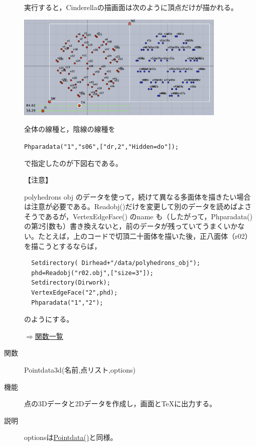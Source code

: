 \documentclass[papersize,a4paper,12pt,uplatex]{jsarticle}
\begin{document}
\begin{description}
実行すると，Cinderellaの描画面は次のように頂点だけが描かれる。

\vspace{\baselineskip}
\begin{center}
 \includegraphics[bb=0 0 726.04 365.02 , width=10cm]{Fig/phparadata01.pdf}
\end{center}
 
\vspace{\baselineskip}
全体の線種と，陰線の線種を
  
\verb|Phparadata("1","s06",["dr,2","Hidden=do"]);|

で指定したのが下図右である。

 \begin{center}     \end{center}

【注意】

  polyhedrons obj のデータを使って，続けて異なる多面体を描きたい場合は注意が必要である。Readobj()だけを変更して別のデータを読めばよさそうであるが，VertexEdgeFace() のname も（したがって，Phparadata()の第2引数も）書き換えないと，前のデータが残っていてうまくいかない。たとえば，上のコードで切頂二十面体を描いた後，正八面体（r02）を描こうとするならば，
\begin{verbatim}
  Setdirectory( Dirhead+"/data/polyhedrons_obj");
  phd=Readobj("r02.obj",["size=3"]);
  Setdirectory(Dirwork);
  VertexEdgeFace("2",phd);
  Phparadata("1","2");
\end{verbatim}
  のようにする。
  

\begin{flushright} \hyperlink{functionlist}{$\Rightarrow$関数一覧}\end{flushright}

\hypertarget{pointdata3d}{}
\item[関数]  Pointdata3d(名前,点リスト,options)
\item[機能]  点の3Dデータと2Dデータを作成し，画面と\TeX に出力する。
\item[説明]  optionsは\hyperlink{pointdata}{Pointdata()}と同様。
\vspace{\baselineskip}


\end{description}
\end{document}
